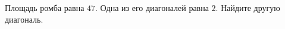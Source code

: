 \begin{ex}
	\begin{condition}
		Площадь ромба равна \( 47 \). Одна из его диагоналей равна \( 2 \). Найдите другую диагональ.
	\end{condition}
\end{ex}